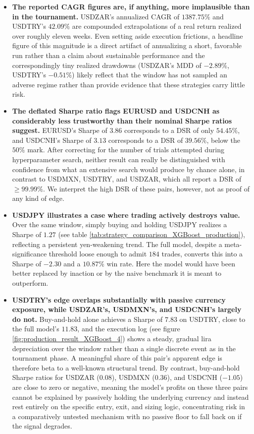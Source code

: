 \documentclass[12pt, a4paper]{article}
\begin{document}
\begin{itemize}
\item \textbf{The reported CAGR figures are, if anything, more implausible than in the tournament.} USDZAR's annualized CAGR of $1387.75\%$ and USDTRY's $42.09\%$ are compounded 
extrapolations of a real return realized over roughly eleven weeks. Even setting aside execution frictions, a headline figure of this magnitude is a direct artifact of annualizing 
a short, favorable run rather than a claim about sustainable performance and the correspondingly tiny realized drawdowns (USDZAR's MDD of $-2.89\%$, USDTRY's $-0.51\%$) likely 
reflect that the window has not sampled an adverse regime rather than provide evidence that these strategies carry little risk.

\item \textbf{The deflated Sharpe ratio flags EURUSD and USDCNH as considerably less trustworthy than their nominal Sharpe ratios suggest.} EURUSD's Sharpe of $3.86$ corresponds 
to a DSR of only $54.45\%$, and USDCNH's Sharpe of $3.13$ corresponds to a DSR of $39.56\%$, below the $50\%$ mark. After correcting for the number of trials attempted during 
hyperparameter search, neither result can really be distinguished with confidence from what an extensive search would produce by chance alone, in contrast to USDMXN, USDTRY, and 
USDZAR, which all report a DSR of $\geq 99.99\%$. We interpret the high DSR of these pairs, however, not as proof of any kind of edge.

\item \textbf{USDJPY illustrates a case where trading actively destroys value.} Over the same window, simply buying and holding USDJPY realizes a Sharpe of $1.27$ 
(see table \ref{tab:strategy_comparison_XGBoost_production}), reflecting a persistent yen-weakening trend. The full model, despite a meta-significance threshold loose enough to 
admit $184$ trades, converts this into a Sharpe of $-2.30$ and a $10.87\%$ win rate. Here the model would have been better replaced by inaction or by the naive benchmark it is 
meant to outperform.

\item \textbf{USDTRY's edge overlaps substantially with passive currency exposure, while USDZAR's, USDMXN's, and USDCNH's largely do not.} Buy-and-hold alone achieves a Sharpe 
of $7.83$ on USDTRY, close to the full model's $11.83$, and the execution log (see figure \ref{fig:production_result_XGBoost_4}) shows a steady, gradual lira depreciation over the 
window rather than a single discrete event as in the tournament phase. A meaningful share of this pair's apparent edge is therefore beta to a well-known structural trend. 
By contrast, buy-and-hold Sharpe ratios for USDZAR ($0.08$), USDMXN ($0.36$), and USDCNH ($-1.05$) are close to zero or negative, meaning the model's profits on these three pairs 
cannot be explained by passively holding the underlying currency and instead rest entirely on the specific entry, exit, and sizing logic, concentrating risk in a comparatively 
untested mechanism with no passive floor to fall back on if the signal degrades.


\end{itemize}
\end{document}

